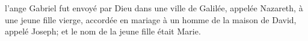 \encetemps l’ange Gabriel fut envoyé par Dieu
		dans une ville de Galilée, appelée Nazareth,
	à une jeune fille vierge,
		accordée en mariage à un homme de la maison de David, appelé Joseph;
	et le nom de la jeune fille était Marie.
